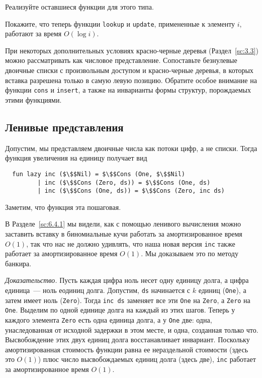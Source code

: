 \begin{exercise}\label{ex:9.5}
  Реализуйте оставшиеся функции для этого типа.
\end{exercise}

\begin{exercise}\label{ex:9.6}
  Покажите, что теперь функции \lstinline!lookup! и
  \lstinline!update!, примененные к элементу $i$, работают за время
  $O(\log i)$.
\end{exercise}

\begin{exercise}\label{ex:9.7}
  При некоторых дополнительных условиях красно-черные деревья
  (Раздел~\ref{sc:3.3}) можно рассматривать как числовое
  представление. Сопоставьте безнулевые двоичные списки с произвольным
  доступом и красно-черные деревья, в которых вставка разрешена только
  в самую левую позицию. Обратите особое внимание на функции
  \lstinline!cons! и \lstinline!insert!, а также на инварианты формы
  структур, порождаемых этими функциями.
\end{exercise}

\subsection{Ленивые представления}
\label{sc:9.2.3}

Допустим, мы представляем двоичные числа как потоки цифр, а не
списки. Тогда функция увеличения на единицу получает вид
\begin{lstlisting}
  fun lazy inc ($\$$Nil) = $\$$Cons (One, $\$$Nil)
         | inc ($\$$Cons (Zero, ds)) = $\$$Cons (One, ds)
         | inc ($\$$Cons (One, ds)) = $\$$Cons (Zero, inc ds)
\end{lstlisting}
Заметим, что функция эта пошаговая.

В Разделе~\ref{sc:6.4.1} мы видели, как с помощью ленивого вычисления
можно заставить вставку в биномиальные кучи работать за
амортизированное время $O(1)$, так что нас не должно удивлять, что
наша новая версия \lstinline!inc! также работает за амортизированное
время $O(1)$. Мы доказываем это по методу банкира.

\emph{Доказательство.} Пусть каждая цифра ноль несет одну единицу долга, а
цифра единица~--- ноль еодиниц долга. Допустим, \lstinline!ds!
начинается с $k$ единиц (\lstinline!One!), а затем имеет ноль
(\lstinline!Zero!). Тогда \lstinline!inc ds! заменяет все эти \lstinline!One!
на \lstinline!Zero!, а \lstinline!Zero! на \lstinline!One!. 
Выделим по одной единице долга на каждый
из этих шагов. Теперь у каждого элемента \lstinline!Zero! есть одна
единица долга, а у \lstinline!One! две: одна, унаследованная от
исходной задержки в этом месте, и одна, созданная только
что. Высвобождение этих двух единиц долга восстанавливает
инвариант. Поскольку амортизированная стоимость функции равна ее
нераздельной стоимости (здесь это $O(1)$) плюс число высвобождаемых
единиц долга (здесь две), \lstinline!inc! работает за амортизированное
время $O(1)$.

 